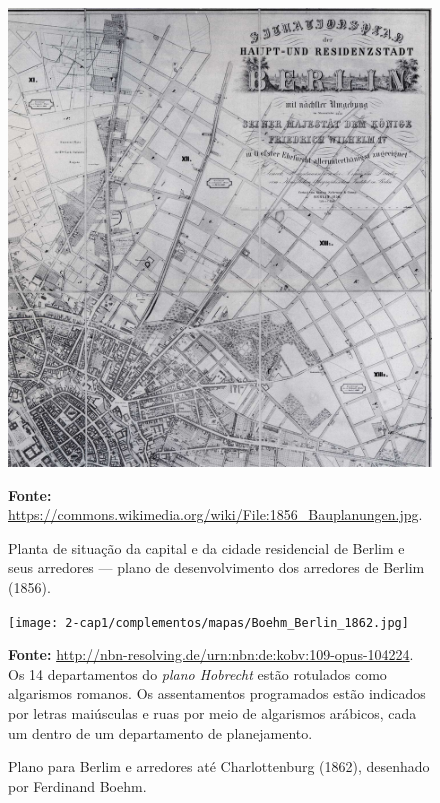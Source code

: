 \begin{a3paisagem}
\begin{figure}[!htp]
\caption{Planta de situação da capital e da cidade residencial de Berlim e seus arredores --- plano de desenvolvimento dos arredores de Berlim (1856).}
\centering
\includegraphics[height=0.9\textheight]{2-cap1/complementos/mapas/1856_Bauplanungen.jpg}{\par \footnotesize \textbf{Fonte:} \url{https://commons.wikimedia.org/wiki/File:1856_Bauplanungen.jpg}.}
\label{fig:bauplannungen1856} 
\end{figure}
\end{a3paisagem}

\begin{a3paisagem}
\begin{figure}[!htp]
\caption{Plano para Berlim e arredores até Charlottenburg (1862), desenhado por Ferdinand Boehm.}
\centering
\texttt{[image: 2-cap1/complementos/mapas/Boehm\_Berlin\_1862.jpg]}{\par \footnotesize \textbf{Fonte:} \url{http://nbn-resolving.de/urn:nbn:de:kobv:109-opus-104224}. Os 14 departamentos do \textit{plano Hobrecht} estão rotulados como algarismos romanos. Os assentamentos programados estão indicados por letras maiúsculas e ruas por meio de algarismos arábicos, cada um dentro de um departamento de planejamento.}
\label{fig:berlin1862} 
\end{figure}
\end{a3paisagem}

